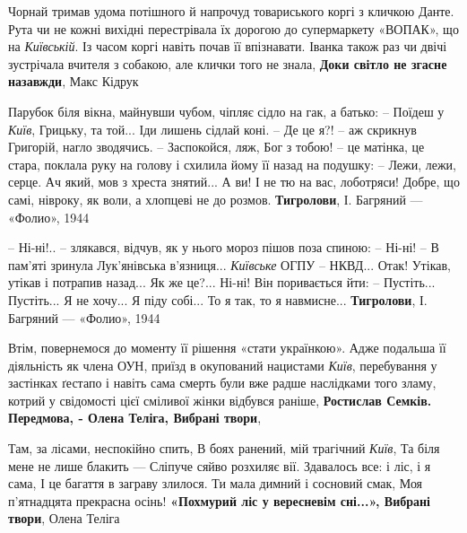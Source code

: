 Чорнай тримав удома потішного й напрочуд товариського коргі з кличкою Данте.
Рута чи не кожні вихідні перестрівала їх дорогою до супермаркету «ВОПАК», що на
\emph{Київській}. Із часом коргі навіть почав її впізнавати. Іванка також раз
чи двічі зустрічала вчителя з собакою, але клички того не знала, \textbf{Доки
світло не згасне назавжди}, Макс Кідрук

Парубок біля вікна, майнувши чубом, чіпляє сідло на гак, а батько:
– Поїдеш у \emph{Київ}, Грицьку, та той... Іди лишень сідлай коні.
– Де це я?! – аж скрикнув Григорій, нагло зводячись.
– Заспокойся, ляж, Бог з тобою! – це матінка, це стара, поклала руку на голову і схилила
йому її назад на подушку: – Лежи, лежи, серце. Ач який, мов з хреста знятий... А ви! І не тю на вас, лоботряси! Добре, що самі, нівроку, як воли, а хлопцеві не до розмов.
\textbf{Тигролови}, І. Багряний — «Фолио», 1944

– Ні-ні!.. – злякався, відчув, як у нього мороз пішов поза спиною: – Ні-ні! – В
пам’яті зринула Лук’янівська в’язниця... \emph{Київське} ОГПУ – НКВД... Отак!
Утікав, утікав і потрапив назад... Як же це?... Ні-ні! Він поривається йти: –
Пустіть... Пустіть... Я не хочу... Я піду собі... То я так, то я навмисне...
\textbf{Тигролови}, І. Багряний — «Фолио», 1944

Втім, повернемося до моменту її рішення «стати українкою». Адже подальша її
діяльність як члена ОУН, приїзд в окупований нацистами \emph{Київ}, перебування
у застінках ґестапо і навіть сама смерть були вже радше наслідками того зламу,
котрий у свідомості цієї сміливої жінки відбувся раніше, \textbf{Ростислав
Семків. Передмова, - Олена Теліга, Вибрані твори},

Там, за лісами, неспокійно спить,
В боях ранений, мій трагічний \emph{Київ},
Та біля мене не лише блакить —
Сліпуче сяйво розхиляє вії.
Здавалось все: і ліс, і я сама,
І це багаття в заграву злилося.
Ти мала димний і сосновий смак,
Моя п’ятнадцята прекрасна осінь!
\textbf{«Похмурий ліс у вересневім сні...», Вибрані твори}, Олена Теліга

